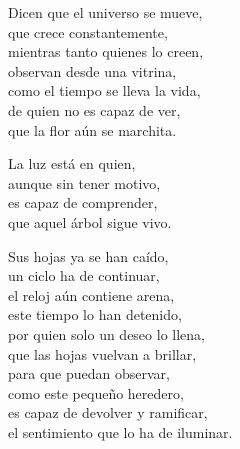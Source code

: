 \begin{center}
\vspace{1em} 
Dicen que el universo se mueve,\\ 
que crece constantemente,\\ 
mientras tanto quienes lo creen,\\ 
observan desde una vitrina,\\ 
como el tiempo se lleva la vida,\\ 
de quien no es capaz de ver,\\ 
que la flor aún se marchita.

\vspace{1em} 
La luz está en quien,\\ 
aunque sin tener motivo,\\ 
es capaz de comprender,\\ 
que aquel árbol sigue vivo.

\vspace{1em} 
Sus hojas ya se han caído,\\ 
un ciclo ha de continuar,\\ 
el reloj aún contiene arena,\\ 
este tiempo lo han detenido,\\ 
por quien solo un deseo lo llena,\\ 
que las hojas vuelvan a brillar,\\ 
para que puedan observar,\\ 
como este pequeño heredero,\\ 
es capaz de devolver y ramificar,\\ 
el sentimiento que lo ha de iluminar.


\end{center}




